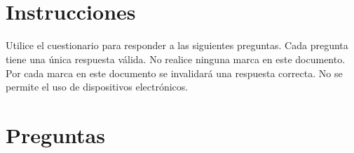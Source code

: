 \documentclass[a4paper,12pt]{article}
\title{{\Huge \subjectname} \\ \examname}
\author{}
\date{}
\begin{document}
\maketitle

\vspace*{-2cm}

\section*{Instrucciones}
Utilice el cuestionario para responder a las siguientes preguntas. Cada pregunta tiene una única respuesta válida. No realice ninguna marca en este documento. Por cada marca en este documento se invalidará una respuesta correcta. No se permite el uso de dispositivos electrónicos. 

\section*{Preguntas}
\end{document}

